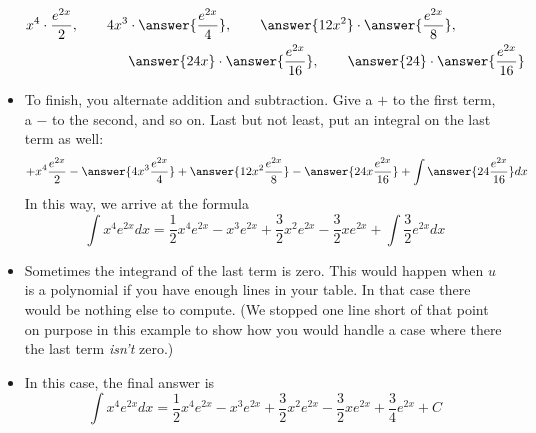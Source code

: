\documentclass{ximera}
\begin{document}
\begin{example}
\begin{itemize}
\begin{center}
\[ \begin{aligned} x^4 \cdot \frac{e^{2x}}{2}, \qquad {4 x^3} & \cdot \answer{\frac{e^{2x}}{4}}, \qquad \answer{12 x^2} \cdot \answer{\frac{e^{2x}}{8}}, \\  & \answer{24 x}  \cdot \answer{\frac{e^{2x}}{16}}, \qquad \answer{24} \cdot \answer{\frac{e^{2x}}{16}} \end{aligned} \]
\end{center}
\item To finish, you alternate addition and subtraction. Give a $+$ to the first term, a $-$ to the second, and so on. Last but not least, put an integral on the last term as well:
\[ + x^4 \frac{e^{2x}}{2} - \answer{4 x^3 \frac{e^{2x}}{4}} + \answer{12 x^2 \frac{e^{2x}}{8}} - \answer{24 x\frac{e^{2x}}{16} }+ \int \answer{24 \frac{e^{2x}}{16}} dx \]
In this way, we arrive at the formula
\[ \int x^4 e^{2x} dx = \frac{1}{2} x^4 e^{2x} - x^3 e^{2x} + \frac{3}{2} x^2 e^{2x} - \frac{3}{2} x e^{2x} + \int \frac{3}{2} e^{2x} dx \]
\item Sometimes the integrand of the last term is zero. This would happen when $u$ is a polynomial if you have enough lines in your table. In that case there would be nothing else to compute.  (We stopped one line short of that point on purpose in this example to show how you would handle a case where there the last term \textit{isn't} zero.)
\item In this case, the final answer is
\[ \int x^4 e^{2x} dx = \frac{1}{2} x^4 e^{2x} - x^3 e^{2x} + \frac{3}{2} x^2 e^{2x} - \frac{3}{2} x e^{2x} + \frac{3}{4} e^{2x} +C \]
\end{itemize}
\end{example}
\end{document}
